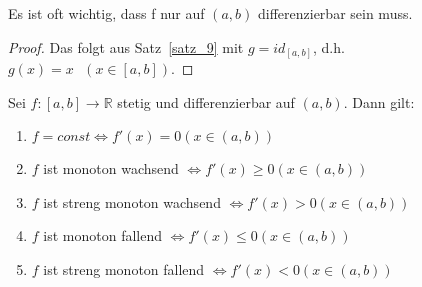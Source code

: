 \begin{Bemerkung}{
	 Es ist oft wichtig, dass f nur auf $(a,b)$ differenzierbar 
	sein muss.
}\end{Bemerkung}

\begin{proof}
	Das folgt aus Satz~\ref{satz_9}
	mit $g = id_{[a,b]}$, d.h. $g(x) = x \textbf{ } (x \in [a,b])$.
\end{proof}


\begin{Satz}{
	\label{satz_11}
	Sei $f:[a,b] \rightarrow \mathbb{R}$ stetig und differenzierbar auf $(a,b)$. 
	Dann gilt:
	\renewcommand{\labelenumi}{\alph{enumi})}
	\begin{enumerate}
		\item $f = const \Leftrightarrow f'(x) = 0 (x\in(a,b))$
		\item $f$ ist monoton wachsend $\Leftrightarrow f'(x) \geq 0 (x \in (a,b))$
		\item $f$ ist streng monoton wachsend $\Leftrightarrow f'(x) > 0 (x \in (a,b
		))$
		\item $f$ ist monoton fallend $\Leftrightarrow f'(x) \leq 0 (x \in (a,b))$
		\item $f$ ist streng monoton fallend $\Leftrightarrow f'(x) < 0 
		(x \in (a,b))$ 
	\end{enumerate}
}\end{Satz}

